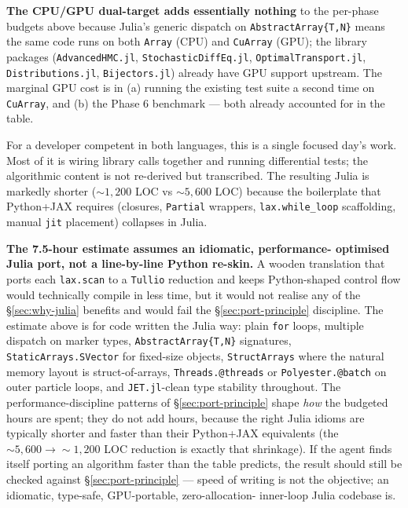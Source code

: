 \documentclass[11pt,a4paper]{article}
\begin{document}
\textbf{The CPU/GPU dual-target adds essentially nothing} to the
per-phase budgets above because Julia's generic dispatch on
\texttt{AbstractArray\{T,N\}} means the same code runs on both
\texttt{Array} (CPU) and \texttt{CuArray} (GPU); the library
packages (\texttt{AdvancedHMC.jl}, \texttt{StochasticDiffEq.jl},
\texttt{OptimalTransport.jl}, \texttt{Distributions.jl},
\texttt{Bijectors.jl}) already have GPU support upstream. The
marginal GPU cost is in (a) running the existing test suite a
second time on \texttt{CuArray}, and (b) the Phase 6 benchmark
--- both already accounted for in the table.

For a developer competent in both languages, this is a single
focused day's work. Most of it is wiring library calls together
and running differential tests; the algorithmic content is not
re-derived but transcribed. The resulting Julia is markedly
shorter ($\sim 1{,}200$ LOC vs $\sim 5{,}600$ LOC) because the
boilerplate that Python+JAX requires (closures, \texttt{Partial}
wrappers, \texttt{lax.while\_loop} scaffolding, manual
\texttt{jit} placement) collapses in Julia.

\textbf{The 7.5-hour estimate assumes an idiomatic, performance-
optimised Julia port, not a line-by-line Python re-skin.} A wooden
translation that ports each \texttt{lax.scan} to a \texttt{Tullio}
reduction and keeps Python-shaped control flow would technically
compile in less time, but it would not realise any of the
§\ref{sec:why-julia} benefits and would fail the
§\ref{sec:port-principle} discipline. The estimate above is for
code written the Julia way: plain \texttt{for} loops, multiple
dispatch on marker types, \texttt{AbstractArray\{T,N\}}
signatures, \texttt{StaticArrays.SVector} for fixed-size objects,
\texttt{StructArrays} where the natural memory layout is
struct-of-arrays, \texttt{Threads.@threads} or
\texttt{Polyester.@batch} on outer particle loops, and
\texttt{JET.jl}-clean type stability throughout. The
performance-discipline patterns of §\ref{sec:port-principle}
shape \emph{how} the budgeted hours are spent; they do not add
hours, because the right Julia idioms are typically shorter and
faster than their Python+JAX equivalents (the
$\sim 5{,}600 \to \sim 1{,}200$ LOC reduction is exactly that
shrinkage). If the agent finds itself porting an algorithm faster
than the table predicts, the result should still be checked
against §\ref{sec:port-principle} --- speed of writing is not the
objective; an idiomatic, type-safe, GPU-portable, zero-allocation-
inner-loop Julia codebase is.
\end{document}
